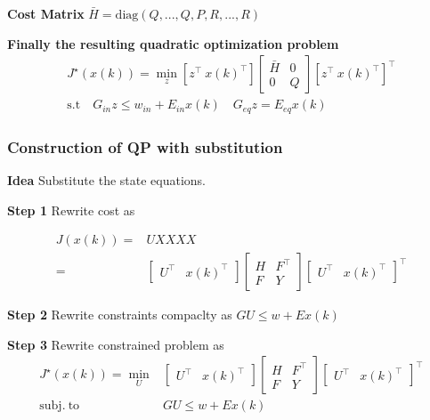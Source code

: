 \textbf{Cost Matrix} $\bar{H} = \mathrm{diag}(Q,..., Q, P, R,..., R)$

\textbf{Finally the resulting quadratic optimization problem}
\[\begin{aligned}
		J^\star(x(k)) = \min_z  \left[ z^\top \ x(k)^\top \right]
		\left[\begin{smallmatrix} \bar{H} & 0 \\ 0 & Q \end{smallmatrix}\right]
		\left[ z^\top \ x(k)^\top \right]^\top \\
		\text{s.t}
		\quad G_{in}z \leq w_{in} + E_{in}x(k)
		\quad	G_{eq}z = E_{eq}x(k)
	\end{aligned}\]

\subsubsection{Construction of QP with substitution}

\textbf{Idea} Substitute the state equations.

\textbf{Step 1} Rewrite cost  as

\[\begin{aligned}
		J(x(k)) = & UXXXX              \\
		=         & \begin{bmatrix}
			            U^\top & x(k)^\top
		            \end{bmatrix}
		\left[\begin{smallmatrix}
				      H & F^\top \\
				      F & Y
			      \end{smallmatrix}\right]
		\begin{bmatrix}
			U^\top & x(k)^\top
		\end{bmatrix}^\top
	\end{aligned} \]


\textbf{Step 2} Rewrite constraints compaclty as $GU\le w+Ex(k)$

\textbf{Step 3} Rewrite constrained problem as
\[\begin{aligned}
		J^\star(x(k)) = \min_U
		                       & \begin{bmatrix}
			                         U^\top & x(k)^\top
		                         \end{bmatrix}
		\left[\begin{smallmatrix}
				      H & F^\top \\
				      F & Y
			      \end{smallmatrix}\right]
		\begin{bmatrix}
			U^\top & x(k)^\top
		\end{bmatrix}^\top                          \\
		\mathrm{subj. \ to \ } & GU \leq w + Ex(k)
	\end{aligned} \]


